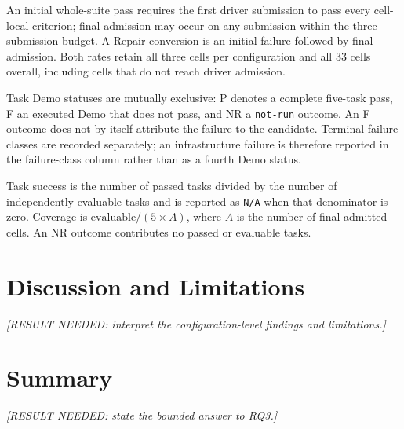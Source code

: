 An initial whole-suite pass requires the first driver submission to pass every
cell-local criterion; final admission may occur on any submission within the
three-submission budget. A Repair conversion is an initial failure followed by
final admission. Both rates retain all three cells per configuration and all
33 cells overall, including cells that do not reach driver admission.

Task Demo statuses are mutually exclusive: P denotes a complete five-task
pass, F an executed Demo that does not pass, and NR a \texttt{not-run}
outcome. An F outcome does not by itself attribute the failure to the
candidate. Terminal failure classes are recorded separately; an
infrastructure failure is therefore reported in the failure-class column
rather than as a fourth Demo status.

Task success is the number of passed tasks divided by the number of
independently evaluable tasks and is reported as \texttt{N/A} when that
denominator is zero. Coverage is $\mathrm{evaluable}/(5 \times A)$, where $A$
is the number of final-admitted cells. An NR outcome contributes no passed or
evaluable tasks.

\section[Discussion and Limitations]{Discussion and Limitations}

\textit{[RESULT NEEDED: interpret the configuration-level findings and
limitations.]}

\section[Summary]{Summary}

\textit{[RESULT NEEDED: state the bounded answer to RQ3.]}
